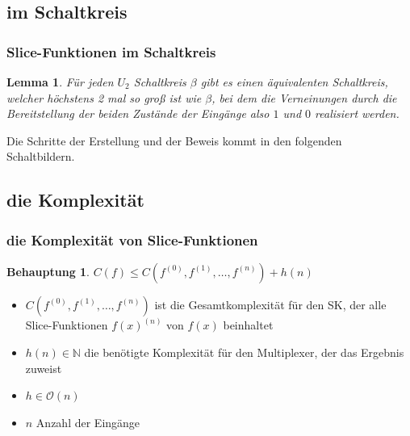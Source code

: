 \documentclass[hyperref={pdfpagelabels=false}]{beamer} %
\newtheorem{lem}{Lemma}
\newtheorem{beh}{Behauptung}
\begin{document}
  \subsection{im Schaltkreis}
  \begin{frame}%
    \frametitle{Slice-Funktionen im Schaltkreis}
    \begin{lem}
      Für jeden $U_2$ Schaltkreis $\beta$ gibt es einen äquivalenten Schaltkreis, welcher höchstens
      2 mal so groß ist wie $\beta$, bei dem die Verneinungen durch die Bereitstellung der beiden Zust\"ande der Eing\"ange also $1$ und $0$ realisiert werden. %
    \end{lem}
    Die Schritte der Erstellung und der Beweis kommt in den folgenden Schaltbildern.

  \end{frame}

  \subsection{die Komplexität}
  \begin{frame}%
    \frametitle{die Komplexität von Slice-Funktionen}
    \begin{beh}
      $C(f) \leq C(f^{(0)}, f^{(1)}, \dots ,f^{(n)})+h(n)$\\
    \end{beh}
    \begin{itemize}
      \item $C(f^{(0)}, f^{(1)}, \dots ,f^{(n)})$ ist die Gesamtkomplexität für den SK, der alle Slice-Funktionen $f(x)^{(n)}$ von $f(x)$ beinhaltet
      \item $h(n) \in \mathbb{N}$ die benötigte Komplexität für den Multiplexer, der das Ergebnis zuweist
      \item $h \in \mathcal{O}(n)$
      \item $n$ Anzahl der Eingänge
    \end{itemize}
  \end{frame}
\end{document}
